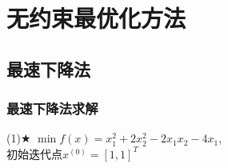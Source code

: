 \section{无约束最优化方法}

\subsection{最速下降法}

\subsubsection{最速下降法求解}

\begin{problem}{(1)$\bigstar$}
    $\min f(x)=x_1^2+2x_2^2-2x_1x_2-4x_1$,\\
    初始迭代点${x^{(0)}}=[1,1]^T$
\end{problem}
